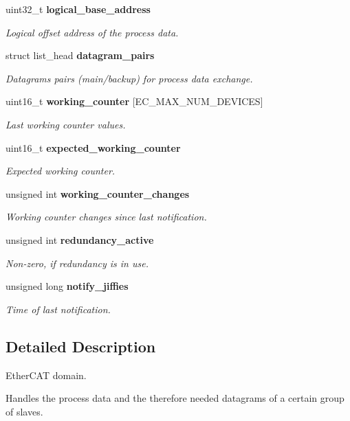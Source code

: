 \begin{DoxyCompactItemize}
uint32\-\_\-t {\bf logical\-\_\-base\-\_\-address}
\begin{DoxyCompactList}\small\item\em \-Logical offset address of the process data. \end{DoxyCompactList}\item 
struct list\-\_\-head {\bf datagram\-\_\-pairs}
\begin{DoxyCompactList}\small\item\em \-Datagrams pairs (main/backup) for process data exchange. \end{DoxyCompactList}\item 
uint16\-\_\-t {\bf working\-\_\-counter} [\-E\-C\-\_\-\-M\-A\-X\-\_\-\-N\-U\-M\-\_\-\-D\-E\-V\-I\-C\-E\-S]
\begin{DoxyCompactList}\small\item\em \-Last working counter values. \end{DoxyCompactList}\item 
uint16\-\_\-t {\bf expected\-\_\-working\-\_\-counter}
\begin{DoxyCompactList}\small\item\em \-Expected working counter. \end{DoxyCompactList}\item 
unsigned int {\bf working\-\_\-counter\-\_\-changes}
\begin{DoxyCompactList}\small\item\em \-Working counter changes since last notification. \end{DoxyCompactList}\item 
unsigned int {\bf redundancy\-\_\-active}
\begin{DoxyCompactList}\small\item\em \-Non-\/zero, if redundancy is in use. \end{DoxyCompactList}\item 
unsigned long {\bf notify\-\_\-jiffies}
\begin{DoxyCompactList}\small\item\em \-Time of last notification. \end{DoxyCompactList}\end{DoxyCompactItemize}


\subsection{\-Detailed \-Description}
\-Ether\-C\-A\-T domain. 

\-Handles the process data and the therefore needed datagrams of a certain group of slaves. 

